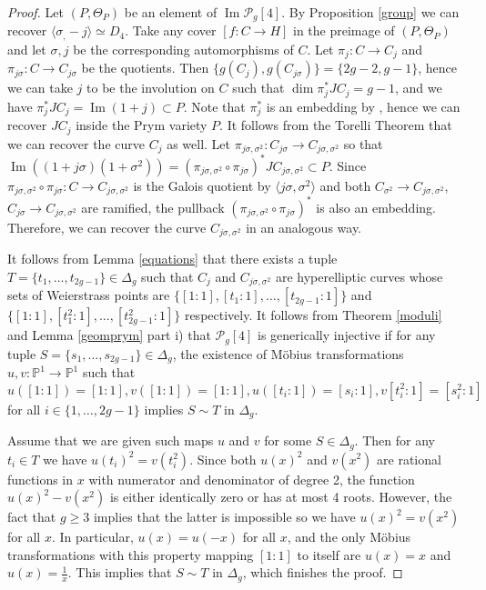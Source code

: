 \documentclass{article}
\numberwithin{equation}{section}
\newcommand{\s}{\sigma}
\DeclareMathOperator{\Image}{Im}
\begin{document}
\begin{proof}
    Let $(P, \Theta_P)$ be an element of $\Image\mathcal{P}_g[4]$. By Proposition \ref{group} we can recover $\langle \sigma_, -j \rangle \simeq D_4$. Take any cover $[f: C \to H]$ in the preimage of $(P, \Theta_P)$ and let $\sigma, j$ be the corresponding automorphisms of $C$. Let $\pi_j: C \to C_j$ and $\pi_{j\sigma}:C \to C_{j\s}$ be the quotients. Then $\{g(C_{j}), g(C_{j\s})\} = \{2g-2, g-1\}$, hence we can take $j$ to be the involution on $C$ such that $\dim \pi_j^*JC_j = g-1$, and we have $\pi_j^*JC_j = \Image(1+j) \subset P$. Note that $\pi_j^*$ is an embedding by \cite[Proposition 11.4.3]{BL}, hence we can recover $JC_j$ inside the Prym variety $P$. It follows from the Torelli Theorem that we can recover the curve $C_j$ as well. Let $\pi_{j\s, \s^2}:C_{j\s} \to C_{j\s, \s^2}$ so that $\Image((1+j\s)(1+\s^2)) = (\pi_{j\s,\s^2}\circ\pi_{j\s})^*JC_{j\s, \s^2} \subset P$. Since $\pi_{j\s,\s^2}\circ\pi_{j\s}: C \to C_{j\s, \s^2}$ is the Galois quotient by $\langle j\s, \s^2 \rangle$ and both $C_{\sigma^2} \to C_{j\s, \s^2}$,  $C_{j\s} \to C_{j\s, \s^2}$ are ramified, the pullback $(\pi_{j\s,\s^2}\circ\pi_{j\s})^*$ is also an embedding. Therefore, we can recover the curve $C_{j\s, \s^2}$ in an analogous way. 

    It follows from Lemma \ref{equations} that there exists a tuple $T = \{t_1, \ldots, t_{2g-1}\} \in \Delta_g$ such that $C_{j}$ and $C_{j\s, \s^2}$ are hyperelliptic curves whose sets of Weierstrass points are $\{[1:1], [t_1:1], \ldots, [t_{2g-1}:1]\}$ and $\{[1:1], [t_1^2:1], \ldots, [t_{2g-1}^2:1]\}$ respectively. It follows from Theorem \ref{moduli} and Lemma \ref{geomprym} part i) that $\mathcal{P}_g[4]$ is generically injective if for any tuple $S = \{s_1, \ldots, s_{2g-1}\} \in \Delta_g$, the existence of Möbius transformations $u, v: \mathbb{P}^1 \to \mathbb{P}^1$ such that $$u([1:1]) = [1:1], v([1:1]) = [1:1], u([t_i:1]) = [s_i:1], v[t_i^2:1] = [s_i^2:1]$$ for all $i \in \{1,\ldots, 2g-1\}$ implies 
    $S \sim T$ in $\Delta_g$. 

    Assume that we are given such maps $u$ and $v$ for some $S \in \Delta_g$. Then for any $t_i \in T$ we have $u(t_i)^2 = v(t_i^2)$. Since both $u(x)^2$ and $v(x^2)$ are rational functions in $x$ with numerator and denominator of degree 2, the function $u(x)^2 - v(x^2)$ is either identically zero or has at most 4 roots. However, the fact that $g \geq 3$ implies that the latter is impossible so we have $u(x)^2 = v(x^2)$ for all $x$. In particular, $u(x) = u(-x)$ for all $x$, and the only Möbius transformations with this property mapping $[1:1]$ to itself are $u(x) = x$ and $u(x) = \frac{1}{x}$. This implies that $S \sim T$ in $\Delta_g$, which finishes the proof.
      
\end{proof}



\end{document}
